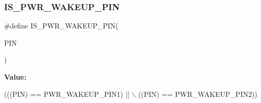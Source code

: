 \subsubsection{\texorpdfstring{I\+S\+\_\+\+P\+W\+R\+\_\+\+W\+A\+K\+E\+U\+P\+\_\+\+P\+IN}{IS\_PWR\_WAKEUP\_PIN}}
{\footnotesize\ttfamily \#define I\+S\+\_\+\+P\+W\+R\+\_\+\+W\+A\+K\+E\+U\+P\+\_\+\+P\+IN(\begin{DoxyParamCaption}\item[{}]{P\+IN }\end{DoxyParamCaption})}

{\bfseries Value\+:}
\begin{DoxyCode}
(((PIN) == PWR\_WAKEUP\_PIN1) || \(\backslash\)
                                ((PIN) == PWR\_WAKEUP\_PIN2))
\end{DoxyCode}
